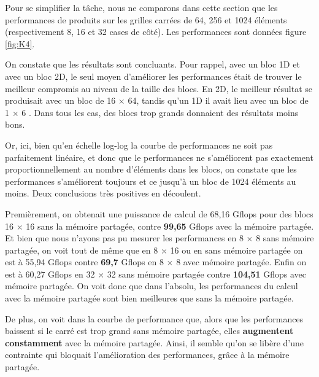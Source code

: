 \documentclass[	DIV=calc,%
							paper=a4,%
							fontsize=11pt%
							]{scrartcl}	 					%
\begin{document}
Pour se simplifier la tâche, nous ne comparons dans cette section que les performances de produits sur les grilles carrées de 64, 256 et 1024 éléments (respectivement 8, 16 et 32 cases de côté). Les performances sont données figure \ref{fig:K4}.\par
On constate que les résultats sont concluants. Pour rappel, avec un bloc 1D et avec un bloc 2D, le seul moyen d'améliorer les performances était de trouver le meilleur compromis au niveau de la taille des blocs. En 2D, le meilleur résultat se produisait avec un bloc de 16 $\times$ 64, tandis qu'un 1D il avait lieu avec un bloc de 1 $\times$ 6
. Dans tous les cas, des blocs trop grands donnaient des résultats moins bons.\par
Or, ici, bien qu'en échelle log-log la courbe de performances ne soit pas parfaitement linéaire, et donc que le performances ne s'améliorent pas exactement proportionnellement au nombre d'éléments dans les blocs, on constate que les performances s'améliorent toujours et ce jusqu'à un bloc de 1024 éléments au moins. Deux conclusions très positives en découlent.\par 
Premièrement, on obtenait une puissance de calcul de 68,16 Gflops pour des blocs 16 $\times$ 16 sans la mémoire partagée, contre \textbf{99,65} Gflops avec la mémoire partagée. Et bien que nous n'ayons pas pu mesurer les performances en 8 $\times$ 8 sans mémoire partagée, on voit tout de même que en 8 $\times$ 16 ou en  sans mémoire partagée on est à 55,94 Gflops contre \textbf{69,7} Gflops en 8 $\times$ 8 avec mémoire partagée. Enfin on est à 60,27 Gflops en 32 $\times$ 32 sans mémoire partagée contre \textbf{104,51} Gflops avec mémoire partagée. On voit donc que dans l'absolu, les performances du calcul avec la mémoire partagée sont bien meilleures que sans la mémoire partagée.\par
De plus, on voit dans la courbe de performance que, alors que les performances baissent si le carré est trop grand sans mémoire partagée, elles \textbf{augmentent constamment} avec la mémoire partagée. Ainsi, il semble qu'on se libère d'une contrainte qui bloquait l'amélioration des performances, grâce à la mémoire partagée.
\end{document}
